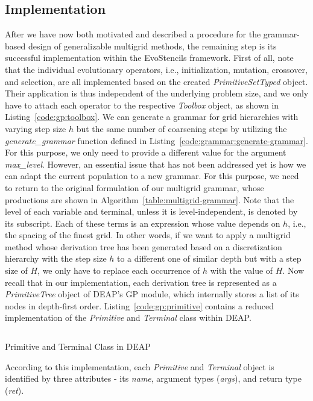 \subsection{Implementation}
After we have now both motivated and described a procedure for the grammar-based design of generalizable multigrid methods, the remaining step is its successful implementation within the EvoStencils framework.
First of all, note that the individual evolutionary operators, i.e., initialization, mutation, crossover, and selection, are all implemented based on the created \emph{PrimitiveSetTyped} object. 
Their application is thus independent of the underlying problem size, and we only have to attach each operator to the respective \emph{Toolbox} object, as shown in Listing~\ref{code:gp:toolbox}.
We can generate a grammar for grid hierarchies with varying step size $h$ but the same number of coarsening steps by utilizing the \emph{generate\_grammar} function defined in Listing~\ref{code:grammar:generate-grammar}.
For this purpose, we only need to provide a different value for the argument \emph{max\_level}.
However, an essential issue that has not been addressed yet is how we can adapt the current population to a new grammar.
For this purpose, we need to return to the original formulation of our multigrid grammar, whose productions are shown in Algorithm~\ref{table:multigrid-grammar}.
Note that the level of each variable and terminal, unless it is level-independent, is denoted by its subscript.
Each of these terms is an expression whose value depends on $h$, i.e., the spacing of the finest grid.
In other words, if we want to apply a multigrid method whose derivation tree has been generated based on a discretization hierarchy with the step size $h$ to a different one of similar depth but with a step size of $H$, we only have to replace each occurrence of $h$ with the value of $H$.
Now recall that in our implementation, each derivation tree is represented as a \emph{PrimitiveTree} object of DEAP's GP module, which internally stores a list of its nodes in depth-first order.
Listing~\ref{code:gp:primitive} contains a reduced implementation of the \emph{Primitive} and \emph{Terminal} class within DEAP.
\begin{listing}
	\inputminted{python}{evostencils/gp/primitive.py}
	\caption{Primitive and Terminal Class in DEAP}
	\label{code:gp:primitive}
\end{listing}
According to this implementation, each \emph{Primitive} and \emph{Terminal} object is identified by three attributes - its \emph{name}, argument types (\emph{args}), and return type (\emph{ret}).
